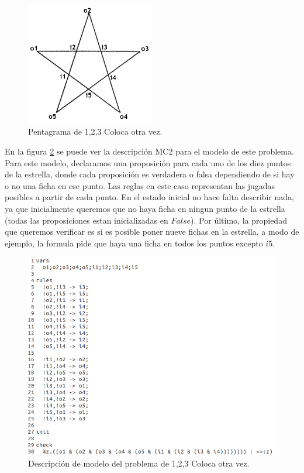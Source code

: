 \begin{figure}[H]
  \centering
  \includegraphics[width=0.5\textwidth]{Figures/pentagram.png}
  \caption{Pentagrama de 1,2,3 Coloca otra vez.}
  \label{fig:pentagrama}
\end{figure}

En la figura \ref{fig:estrella} se puede ver la descripción MC2 para el modelo de este problema. Para este modelo, declaramos una proposición para cada uno de los diez puntos de la estrella, donde cada proposición es verdadera o falsa dependiendo de si hay o no una ficha en ese punto. Las reglas en este caso representan las jugadas posibles a partir de cada punto. En el estado inicial no hace falta describir nada, ya que inicialmente queremos que no haya ficha en ningun punto de la estrella (todas las proposiciones estan inicializadas en $False$). Por último, la propiedad que queremos verificar es si es posible poner nueve fichas en la estrella, a modo de ejemplo, la formula pide que haya una ficha en todos los puntos excepto $i5$.

\begin{figure}[H]
  \centering
  \includegraphics[width=1\textwidth]{Figures/estrella.png}
  \caption{Descripción de modelo del problema de 1,2,3 Coloca otra vez.}
  \label{fig:estrella}
\end{figure}

